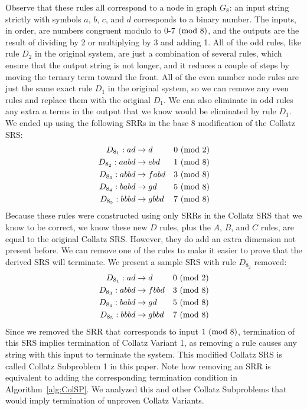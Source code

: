 Observe that these rules all correspond to a node in graph $G_8$: an input string strictly with symbols $a$, $b$, $c$, and $d$ corresponds to a binary number. The inputs, in order, are numbers congruent modulo to 0-7$\ (\mathrm{mod}\ 8)$, and the outputs are the result of dividing by 2 or multiplying by 3 and adding 1. All of the odd rules, like rule $D_2$ in the original system, are just a combination of several rules, which ensure that the output string is not longer, and it reduces a couple of steps by moving the ternary term toward the front. All of the even number node rules are just the same exact rule $D_1$ in the original system, so we can remove any even rules and replace them with the original $D_1$. We can also eliminate in odd rules any extra $a$ terms in the output that we know would be eliminated by rule $D_1$. We ended up using the following SRRs in the base 8 modification of the Collatz SRS:
\begin{align*}
    D_{8_1}: ad &\rightarrow d &\text{$0\ (\mathrm{mod}\ 2)$}\\
    D_{8_2}: aabd &\rightarrow ebd &\text{$1\ (\mathrm{mod}\ 8)$}\\
    D_{8_3}: abbd &\rightarrow fabd &\text{$3\ (\mathrm{mod}\ 8)$}\\
    D_{8_4}: babd &\rightarrow gd &\text{$5\ (\mathrm{mod}\ 8)$}\\
    D_{8_5}: bbbd &\rightarrow gbbd &\text{$7\ (\mathrm{mod}\ 8)$}
\end{align*}
Because these rules were constructed using only SRRs in the Collatz SRS that we know to be correct, we know these new $D$ rules, plus the $A$, $B$, and $C$ rules, are equal to the original Collatz SRS. However, they do add an extra dimension not present before. We can remove one of the rules to make it easier to prove that the derived SRS will terminate. We present a sample SRS with rule $D_{8_2}$ removed:
\begin{align*}
    D_{8_1}: ad &\rightarrow d &\text{$0\ (\mathrm{mod}\ 2)$}\\
    D_{8_3}: abbd &\rightarrow fbbd &\text{$3\ (\mathrm{mod}\ 8)$}\\
    D_{8_4}: babd &\rightarrow gd &\text{$5\ (\mathrm{mod}\ 8)$}\\
    D_{8_5}: bbbd &\rightarrow gbbd &\text{$7\ (\mathrm{mod}\ 8)$}
\end{align*}
Since we removed the SRR that corresponds to input $1 \ (\mathrm{mod}\ 8)$, termination of this SRS implies termination of Collatz Variant 1, as removing a rule causes any string with this input to terminate the system. This modified Collatz SRS is called Collatz Subproblem 1 in this paper. Note how removing an SRR is equivalent to adding the corresponding termination condition in Algorithm~\ref{alg:ColSP}.  We analyzed this and other Collatz Subproblems that would imply termination of unproven Collatz Variants.\par
